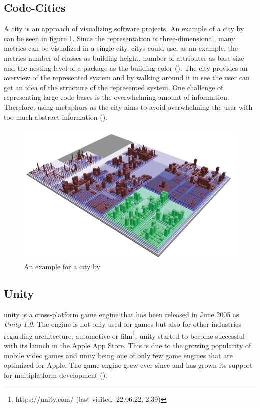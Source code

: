 \subsection{Code-Cities}
\label{sec:code_cities}
A \gls{city} is an approach of visualizing software projects.
An example of a \gls{city} by \cite{wettel2007visualizing} can be seen in figure \ref{fig:city_example}.
Since the representation is three-dimensional, many metrics can be visualized in a single \gls{city}.
\glspl{city} could use, as an example, the metrics number of classes as building height, number of attributes as base size and the nesting level of a package as the building color (\cite{wettel2008visual}).
The \gls{city} provides an overview of the represented system and by walking around it in \gls{see} the user can get an idea of the structure of the represented system.
One challenge of representing large code bases is the overwhelming amount of information.
Therefore, using metaphors as the \gls{city} aims to avoid overwhelming the user with too much abstract information (\cite{Wettel2008}).
\begin{figure}[htb]
    \centering
    \includegraphics[width=1\textwidth]{Fundamentals/img/code_city.png}
    \caption{An example for a \gls{city} by \cite{wettel2007visualizing}}
    \label{fig:city_example}
\end{figure}

\subsection{Unity}
\label{sec:unity}
\gls{unity} is a cross-platform game engine that has been released in June 2005 as \textit{Unity 1.0}.
The engine is not only used for games but also for other industries regarding architecture, automotive or film\footnote{https://unity.com/ (last visited: 22.06.22, 2:39)}.
\gls{unity} started to become successful with its launch in the Apple App Store. 
This is due to the growing popularity of mobile video games and \gls{unity} being one of only few game engines that are optimized for Apple.
The game engine grew ever since and has grown its support for multiplatform development (\cite{nicoll2019unity}).

